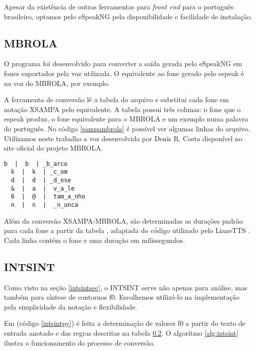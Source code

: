 Apesar da existência de outras ferramentas para \emph{front end} para o
português brasileiro, optamos pelo eSpeakNG pela disponibilidade e facilidade de
instalação.


\subsection{MBROLA}
O programa  foi desenvolvido para converter a saída gerada
pelo eSpeakNG em fones suportados pela voz utilizada. O equivalente ao
fone \code{/&/} gerado pelo espeak é  na voz do MBROLA, por exemplo.

A ferramenta de conversão lê a tabela do arquivo  e
substitui cada fone em notação XSAMPA pelo equivalente. A tabela possui três
colunas: o fone que o espeak produz, o fone equivalente para o MBROLA e um
exemplo numa palavra do português. No código \ref{sampambrola} é possível ver
algumas linhas do arquivo. Utilizamos neste trabalho a voz 
desenvolvida por Denis R. Costa disponível no site oficial do projeto MBROLA.

\begin{lstlisting}[caption=Extrato de linhas da tabela de conversão, label=sampambrola]
  b  |  b  | _b_arco
  k  |  k  | _c_om
  d  |  d  | _d_ose
  &  |  a  |  v_a_le
  6  |  @  |  tam_a_nho
  n  |  n  |  _n_unca
\end{lstlisting}

Além da conversão XSAMPA-MBROLA, são determinadas as durações padrão para cada
fone a partir da tabela , adaptada do código utilizado pelo
LianeTTS \cite{lianetts}. Cada linha contém o fone e uma duração em milissegundos.

\subsection{INTSINT}
\label{intsintrules}
Como visto na seção \ref{intsintsec}, o INTSINT serve não apenas para análise,
mas também para síntese de contornos f0. Escolhemos utilizá-lo na implementação
pela simplicidade da notação e flexibilidade.

Em  (código \ref{intsintpy}) é feita a determinação de valores f0 a partir do texto de
entrada anotado e das regras descritas na tabela \ref{intsintrules}. O
algoritmo \ref{alg:intsint} ilustra o funcionamento do processo de conversão.

